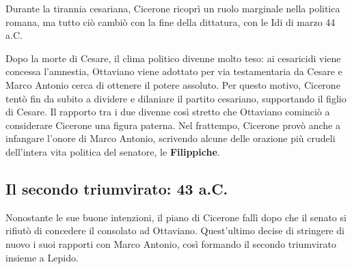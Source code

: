 \documentclass[10pt,a4paper]{article}
\begin{document}
Durante la tirannia cesariana, Cicerone ricoprì un ruolo marginale nella politica romana, ma tutto ciò cambiò con la fine della dittatura, con le Idi di marzo 44 a.C.

Dopo la morte di Cesare, il clima politico divenne molto teso: ai cesaricidi viene concessa l'amnestia, Ottaviano viene adottato per via testamentaria da Cesare e Marco Antonio cerca di ottenere il potere assoluto. Per questo motivo, Cicerone tentò fin da subito a dividere e dilaniare il partito cesariano, supportando il figlio di Cesare. Il rapporto tra i due divenne così stretto che Ottaviano cominciò a considerare Cicerone una figura paterna. Nel frattempo, Cicerone provò anche a infangare l'onore di Marco Antonio, scrivendo alcune delle orazione più crudeli dell'intera vita politica del senatore, le \textbf{Filippiche}.

\subsection*{Il secondo triumvirato: 43 a.C.}

Nonostante le sue buone intenzioni, il piano di Cicerone fallì dopo che il senato si rifiutò di concedere il consolato ad Ottaviano. Quest'ultimo decise di stringere di nuovo i suoi rapporti con Marco Antonio, così formando il secondo triumvirato insieme a Lepido.  
\end{document}
